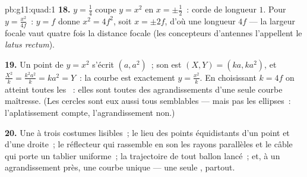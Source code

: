 \begin{solution}{pb:g11:quad:1}
\textbf{18.} $y = \frac14$ coupe $y = x^2$ en $x = \pm\frac12$~:
corde de longueur $1$. Pour $y = \frac{x^2}{4f}$~: $y = f$ donne
$x^2 = 4f^2$, soit $x = \pm 2f$, d'où une longueur $4f$ --- la
largeur focale vaut quatre fois la distance focale (les concepteurs
d'antennes l'appellent le \emph{latus rectum}).

\textbf{19.} Un point de $y = x^2$ s'écrit $(a, a^2)$~; son  est
$(X, Y) = (ka, ka^2)$, et $\frac{X^2}{k} = \frac{k^2a^2}{k} =
ka^2 = Y$~: la courbe  est exactement $y = \frac{x^2}{k}$. En
choisissant $k = 4f$ on atteint toutes les ~: elles sont
toutes des agrandissements d'une seule courbe maîtresse. (Les cercles
sont eux aussi tous semblables --- mais pas les ellipses~:
l'aplatissement compte, l'agrandissement non.)

\textbf{20.} Une  à trois costumes lisibles~; le lieu des
points équidistants d'un point et d'une droite~; le réflecteur qui
rassemble en son  les rayons parallèles et le câble qui porte un
tablier uniforme~; la trajectoire de tout ballon lancé~; et, à un
agrandissement près, une courbe unique --- une seule ,
partout.
\end{solution}
